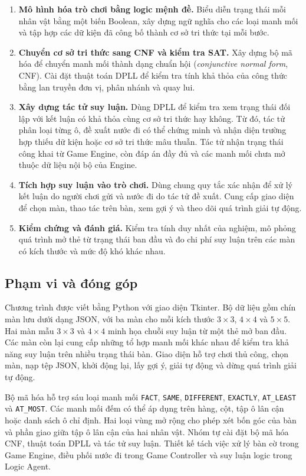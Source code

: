 \begin{enumerate}
    \item \textbf{Mô hình hóa trò chơi bằng logic mệnh đề.} Biểu diễn
    trạng thái mỗi nhân vật bằng một biến Boolean, xây dựng ngữ nghĩa
    cho các loại manh mối và tập hợp các dữ kiện đã công bố thành cơ sở
    tri thức tại mỗi bước.
    \item \textbf{Chuyển cơ sở tri thức sang CNF và kiểm tra SAT.} Xây
    dựng bộ mã hóa để chuyển manh mối thành dạng chuẩn hội
    (\emph{conjunctive normal form}, CNF). Cài đặt thuật toán DPLL để
    kiểm tra tính khả thỏa của công thức bằng lan truyền đơn vị, phân
    nhánh và quay lui.
    \item \textbf{Xây dựng tác tử suy luận.} Dùng DPLL để kiểm tra xem
    trạng thái đối lập với kết luận có khả thỏa cùng cơ sở tri thức hay
    không. Từ đó, tác tử phân loại từng ô, đề xuất nước đi có thể chứng
    minh và nhận diện trường hợp thiếu dữ kiện hoặc cơ sở tri thức mâu
    thuẫn. Tác tử nhận trạng thái công khai từ Game Engine, còn đáp án
    đầy đủ và các manh mối chưa mở thuộc dữ liệu nội bộ của Engine.
    \item \textbf{Tích hợp suy luận vào trò chơi.} Dùng chung quy tắc
    xác nhận để xử lý kết luận do người chơi gửi và nước đi do tác tử đề
    xuất. Cung cấp giao diện để chọn màn, thao tác trên bàn, xem gợi ý
    và theo dõi quá trình giải tự động.
    \item \textbf{Kiểm chứng và đánh giá.} Kiểm tra tính duy nhất của
    nghiệm, mô phỏng quá trình mở thẻ từ trạng thái ban đầu và đo chi
    phí suy luận trên các màn có kích thước và mức độ khó khác nhau.
\end{enumerate}

\subsection{Phạm vi và đóng góp}

Chương trình được viết bằng Python với giao diện Tkinter. Bộ dữ liệu
gồm chín màn lưu dưới dạng JSON, với ba màn cho mỗi kích thước
$3\times3$, $4\times4$ và $5\times5$. Hai màn mẫu $3\times3$ và
$4\times4$ minh họa chuỗi suy luận từ một thẻ mở ban đầu. Các màn còn
lại cung cấp những tổ hợp manh mối khác nhau để kiểm tra khả năng
suy luận trên nhiều trạng thái bàn. Giao diện hỗ trợ chơi thủ công,
chọn màn, nạp tệp JSON, khởi động lại, lấy gợi ý, giải tự động và dừng
quá trình giải tự động.

Bộ mã hóa hỗ trợ sáu loại manh mối \texttt{FACT}, \texttt{SAME},
\texttt{DIFFERENT}, \texttt{EXACTLY}, \texttt{AT\_LEAST} và
\texttt{AT\_MOST}. Các manh mối đếm có thể áp dụng trên hàng, cột, tập
ô lân cận hoặc danh sách ô chỉ định. Hai loại vùng mở rộng cho phép
xét bốn góc của bàn và phần giao giữa tập ô lân cận của hai nhân vật.
Nhóm tự cài đặt bộ mã hóa CNF, thuật toán DPLL và tác tử suy luận.
Thiết kế tách việc xử lý bàn cờ trong Game Engine, điều phối nước đi
trong Game Controller và suy luận logic trong Logic Agent.

